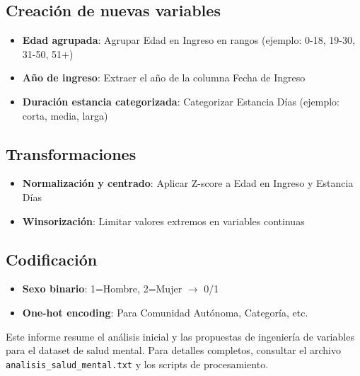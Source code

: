 \documentclass[a4paper,12pt]{article}
\begin{document}
\subsection{Creación de nuevas variables}
\begin{itemize}
  \item \textbf{Edad agrupada}: Agrupar Edad en Ingreso en rangos (ejemplo: 0-18, 19-30, 31-50, 51+)
  \item \textbf{Año de ingreso}: Extraer el año de la columna Fecha de Ingreso
  \item \textbf{Duración estancia categorizada}: Categorizar Estancia Días (ejemplo: corta, media, larga)
\end{itemize}

\subsection{Transformaciones}
\begin{itemize}
  \item \textbf{Normalización y centrado}: Aplicar Z-score a Edad en Ingreso y Estancia Días
  \item \textbf{Winsorización}: Limitar valores extremos en variables continuas
\end{itemize}

\subsection{Codificación}
\begin{itemize}
  \item \textbf{Sexo binario}: 1=Hombre, 2=Mujer $\rightarrow$ 0/1
  \item \textbf{One-hot encoding}: Para Comunidad Autónoma, Categoría, etc.
\end{itemize}

\vspace{1cm}
\noindent Este informe resume el análisis inicial y las propuestas de ingeniería de variables para el dataset de salud mental. Para detalles completos, consultar el archivo \texttt{analisis\_salud\_mental.txt} y los scripts de procesamiento.
\end{document}
